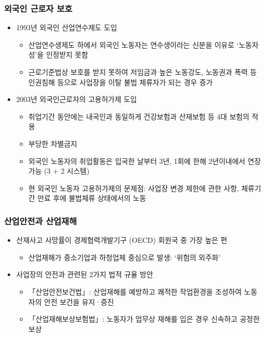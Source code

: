 \documentclass[aspectratio=169,xcolor=dvipsnames,handout]{beamer}
\begin{document}
\begin{frame}[allowframebreaks]
    \frametitle{외국인 근로자 보호}
    \begin{itemize}[<+->]
        \item 1993년 외국인 산업연수제도 도입
        \begin{itemize}
            \item 산업연수생제도 하에서 외국인 노동자는 연수생이라는 신분을 이유로 `노동자성'을 인정받지 못함
            \item 근로기준법상 보호를 받지 못하여 저임금과 높은 노동강도, 노동권과 폭력 등 인권침해 등으로 사업장을 이탈 불법 체류자가 되는 경우 증가
        \end{itemize}
        \framebreak%
        \item 2003년 외국인근로자의 고용허가제 도입
        \begin{itemize}
            \item 취업기간 동안에는 내국인과 동일하게 건강보험과 산재보험 등 4대 보험의 적용
            \item 부당한 차별금지
            \item 외국인 노동자의 취업활동은 입국한 날부터 3년, 1회에 한해 2년이내에서 연장 가능 (3 + 2 시스템) 
            \item 현 외국인 노동자 고용허가제의 문제점: 사업장 변경 제한에 관한 사항, 체류기간 만료 후에 불법체류 상태에서의 노동
        \end{itemize}
    \end{itemize}
\end{frame}

\begin{frame}
    \frametitle{산업안전과 산업재해}
    \begin{itemize}[<+->]
        \item 산재사고 사망률이 경제협력개발기구 (OECD) 회원국 중 가장 높은 편
        \begin{itemize}
                \item 산업재해가 중소기업과 하청업체 중심으로 발생: `위험의 외주화'
        \end{itemize}
        \item 사업장의 안전과 관련된 2가지 법적 규율 방안
        \begin{itemize}
            \item 「산업안전보건법」: 산업재해를 예방하고 쾌적한 작업환경을 조성하여 노동자의 안전 보건을 유지·증진
            \item 「산업재해보상보험법」: 노동자가 업무상 재해를 입은 경우 신속하고 공정한 보상
        \end{itemize}
    \end{itemize}
\end{frame}

\end{document}
